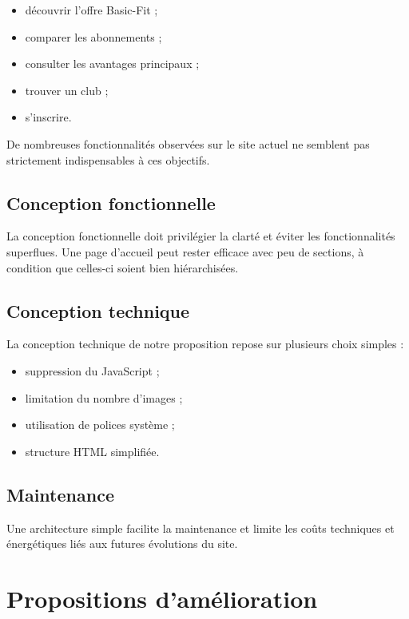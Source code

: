 \documentclass[11pt,a4paper]{article}
\begin{document}
\begin{itemize}
\item découvrir l'offre Basic-Fit ;
\item comparer les abonnements ;
\item consulter les avantages principaux ;
\item trouver un club ;
\item s'inscrire.
\end{itemize}

De nombreuses fonctionnalités observées sur le site actuel ne semblent pas strictement indispensables à ces objectifs.

\subsection{Conception fonctionnelle}

La conception fonctionnelle doit privilégier la clarté et éviter les fonctionnalités superflues. Une page d'accueil peut rester efficace avec peu de sections, à condition que celles-ci soient bien hiérarchisées.

\subsection{Conception technique}

La conception technique de notre proposition repose sur plusieurs choix simples :

\begin{itemize}
\item suppression du JavaScript ;
\item limitation du nombre d'images ;
\item utilisation de polices système ;
\item structure HTML simplifiée.
\end{itemize}

\subsection{Maintenance}

Une architecture simple facilite la maintenance et limite les coûts techniques et énergétiques liés aux futures évolutions du site.

\section{Propositions d'amélioration}
\end{document}
